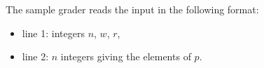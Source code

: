 The sample grader reads the input in the following format:

\begin{itemize}
\item line 1: integers $n$, $w$, $r$, 
\item line 2: $n$ integers giving the elements of $p$.
\end{itemize}
